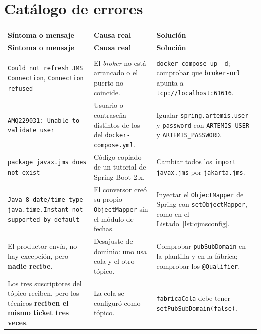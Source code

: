 \documentclass[11pt,a4paper]{book}
\newcommand{\clase}[1]{\texttt{#1}}
\newcommand{\ruta}[1]{\texttt{#1}}
\begin{document}
\section{Catálogo de errores}

\begin{center}
	\footnotesize
	\begin{xltabular}{\textwidth}{@{}>{\raggedright\arraybackslash}p{4.6cm}>{\raggedright\arraybackslash}X>{\raggedright\arraybackslash}X@{}}
		\toprule
		\textbf{Síntoma o mensaje} & \textbf{Causa real} & \textbf{Solución} \\
		\midrule
		\endfirsthead
		\toprule
		\textbf{Síntoma o mensaje} & \textbf{Causa real} & \textbf{Solución} \\
		\midrule
		\endhead
		\midrule
		 \\
		\endfoot
		\bottomrule
		\endlastfoot

		\texttt{Could not refresh JMS Connection}, \texttt{Connection refused} &
		El \emph{broker} no está arrancado o el puerto no coincide. &
		\texttt{docker compose up -d}; comprobar que \texttt{broker-url} apunta a \texttt{tcp://localhost:61616}. \\

		\texttt{AMQ229031: Unable to validate user} &
		Usuario o contraseña distintos de los del \ruta{docker-compose.yml}. &
		Igualar \texttt{spring.artemis.user} y \texttt{password} con \texttt{ARTEMIS\_USER} y \texttt{ARTEMIS\_PASSWORD}. \\

		\texttt{package javax.jms does not exist} &
		Código copiado de un tutorial de Spring Boot 2.x. &
		Cambiar todos los \texttt{import javax.jms} por \texttt{jakarta.jms}. \\

		\texttt{Java 8 date/time type java.time.Instant not supported by default} &
		El conversor creó su propio \clase{ObjectMapper} sin el módulo de fechas. &
		Inyectar el \clase{ObjectMapper} de Spring con \texttt{setObjectMapper}, como en el Listado~\ref{lst:cjmsconfig}. \\

		El productor envía, no hay excepción, pero \textbf{nadie recibe}. &
		Desajuste de dominio: uno usa cola y el otro tópico. &
		Comprobar \texttt{pubSubDomain} en la plantilla y en la fábrica; comprobar los \texttt{@Qualifier}. \\

		Los tres suscriptores del tópico reciben, pero los técnicos \textbf{reciben el mismo ticket tres veces}. &
		La cola se configuró como tópico. &
		\texttt{fabricaCola} debe tener \texttt{setPubSubDomain(false)}. \\


\end{xltabular}
\end{center}
\end{document}
